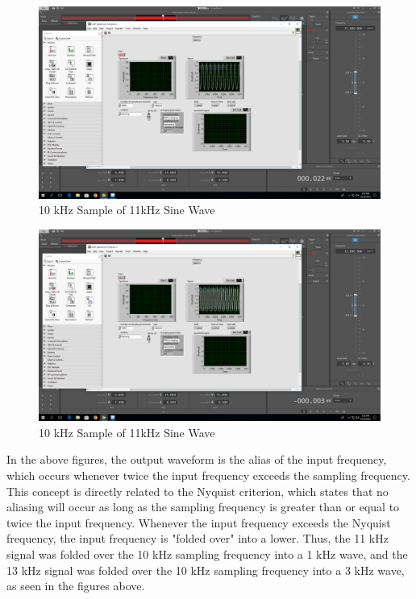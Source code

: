 \documentclass[10pt]{article}
\begin{document}
\begin{centering}
	\begin{figure} [H]
		\centering
		\includegraphics[scale=0.22]{images/51a11000input1000measured.PNG}
		\caption{10 kHz Sample of 11kHz Sine Wave}
		\label{fig:11khz}
	\end{figure}
\end{centering}

\begin{centering}
	\begin{figure} [H]
		\centering
		\includegraphics[scale=0.22]{images/51a13000input3000measured.PNG}
		\caption{10 kHz Sample of 11kHz Sine Wave}
		\label{fig:13khz}
	\end{figure}
\end{centering}

In the above figures, the output waveform is the alias of the input frequency, which occurs whenever twice the input frequency exceeds the sampling frequency. This concept is directly related to the Nyquist criterion, which states that no aliasing will occur as long as the sampling frequency is greater than or equal to twice the input frequency. Whenever the input frequency exceeds the Nyquist frequency, the input frequency is "folded over" into a lower. Thus, the 11 kHz signal was folded over the 10 kHz sampling frequency into a 1 kHz wave, and the 13 kHz signal was folded over the 10 kHz sampling frequency into a 3 kHz wave, as seen in the figures above. 
\end{document}
